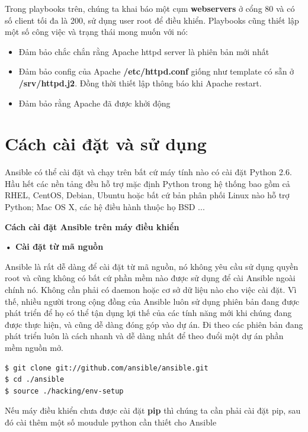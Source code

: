 Trong playbooks trên, chúng ta khai báo một cụm \textbf{webservers} ở cổng 80 và có số client tối đa là 200, sử dụng user root để điều khiển. Playbooks cũng thiết lập một số công việc và trạng thái mong muốn với nó:

\begin{itemize}
\item Đảm bảo chắc chắn rằng Apache httpd server là phiên bản mới nhất
\item Đảm bảo config của Apache \textbf{/etc/httpd.conf} giống như template có sẵn ở \textbf{/srv/httpd.j2}. Đồng thời thiết lập thông báo khi Apache restart.
\item Đảm bảo rằng Apache đã được khởi động
\end{itemize}

\section{Cách cài đặt và sử dụng}

Ansible có thể cài đặt và chạy trên bất cứ máy tính nào có cài đặt Python 2.6. Hầu hết các nền tảng đều hỗ trợ mặc định Python trong hệ thống bao gồm cả RHEL, CentOS, Debian, Ubuntu hoặc bất cứ bản phân phối Linux nào hỗ trợ Python; Mac OS X, các hệ điều hành thuộc họ BSD ...

\textbf{\large Cách cài đặt Ansible trên máy điều khiển}

\textbf{• Cài đặt từ mã nguồn}

Ansible là rất dễ dàng để cài đặt từ mã nguồn, nó không yêu cầu sử dụng quyền root và cũng không có bất cứ phần mềm nào được sử dụng để cài Ansible ngoài chính nó. Không cần phải có daemon hoặc cơ sở dữ liệu nào cho việc cài đặt. Vì thế, nhiều người trong cộng đồng của Ansible luôn sử dụng phiên bản đang được phát triển để họ có thể tận dụng lợi thế của các tính năng mới khi chúng đang được thực hiện, và cũng dễ dàng đóng góp vào dự án. Đi theo các phiên bản đang phát triển luôn là cách nhanh và dễ dàng nhất để theo đuổi một dự án phần mềm nguồn mở.


\begin{lstlisting}[label={lst:ansible_install_from_source},caption={Cài đặt Ansible từ mã nguồn}, language=bash, deletekeywords={env}]
$ git clone git://github.com/ansible/ansible.git
$ cd ./ansible
$ source ./hacking/env-setup
\end{lstlisting}

Nếu máy điều khiển chưa được cài đặt \textbf{pip} thì chúng ta cần phải cài đặt pip, sau đó cài thêm một số moudule python cần thiết cho Ansible

